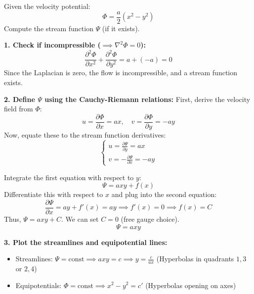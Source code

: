 \begin{exbox}
Given the velocity potential:
\begin{equation*}
    \Phi = \frac{a}{2}(x^2 - y^2)
\end{equation*}
Compute the stream function $\Psi$ (if it exists).

\textbf{1. Check if incompressible ($\implies \nabla^2 \Phi = 0$):}
\begin{equation*}
    \frac{\partial^2 \Phi}{\partial x^2} + \frac{\partial^2 \Phi}{\partial y^2} = a + (-a) = 0
\end{equation*}
Since the Laplacian is zero, the flow is incompressible, and a stream function exists.

\textbf{2. Define $\Psi$ using the Cauchy-Riemann relations:}
First, derive the velocity field from $\Phi$:
\begin{equation*}
    u = \frac{\partial \Phi}{\partial x} = ax, \quad v = \frac{\partial \Phi}{\partial y} = -ay
\end{equation*}
Now, equate these to the stream function derivatives:
\begin{equation*}
    \begin{cases}
        u = \frac{\partial \Psi}{\partial y} = ax \\
        v = -\frac{\partial \Psi}{\partial x} = -ay
    \end{cases}
\end{equation*}

Integrate the first equation with respect to $y$:
\begin{equation*}
    \Psi = axy + f(x)
\end{equation*}
Differentiate this with respect to $x$ and plug into the second equation:
\begin{equation*}
    \frac{\partial \Psi}{\partial x} = ay + f'(x) = ay \implies f'(x) = 0 \implies f(x) = C
\end{equation*}
Thus, $\Psi = axy + C$. We can set $C = 0$ (free gauge choice).
\begin{equation*}
    \Psi = axy
\end{equation*}


\textbf{3. Plot the streamlines and equipotential lines:}
\begin{itemize}
    \item Streamlines: $\Psi = \text{const} \implies axy = c \implies y = \frac{c}{ax}$ (Hyperbolas in quadrants $1, 3$ or $2, 4$)
    \item Equipotentials: $\Phi = \text{const} \implies x^2 - y^2 = c'$ (Hyperbolas opening on axes)
\end{itemize}
\end{exbox}

